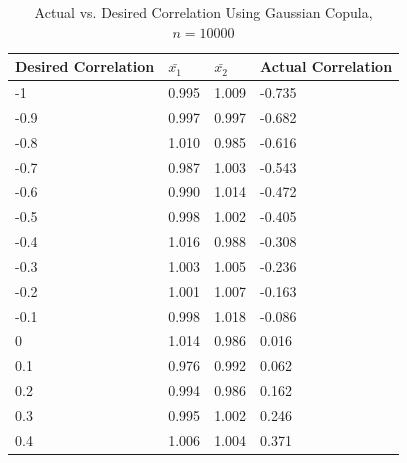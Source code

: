 \begin{table}
\label{tab:experimental_correlation}
\centering
\caption{Actual vs. Desired Correlation Using Gaussian Copula, $n=10000$}
\begin{tabular}{l|l|l|l}
\hline \hline
\textbf{Desired Correlation} & $\bar{x_1}$ & $\bar{x_2}$ & \textbf{Actual Correlation}  \\ 
\hline
-1                  & 0.995                           & 1.009                           & -0.735              \\
-0.9                & 0.997                           & 0.997                           & -0.682              \\
-0.8                & 1.010                            & 0.985                           & -0.616              \\
-0.7                & 0.987                           & 1.003                           & -0.543              \\
-0.6                & 0.990                            & 1.014                           & -0.472              \\
-0.5                & 0.998                           & 1.002                           & -0.405              \\
-0.4                & 1.016                           & 0.988                           & -0.308              \\
-0.3                & 1.003                           & 1.005                           & -0.236              \\
-0.2                & 1.001                           & 1.007                           & -0.163              \\
-0.1                & 0.998                           & 1.018                           & -0.086              \\
0                   & 1.014                           & 0.986                           & 0.016               \\
0.1                 & 0.976                           & 0.992                           & 0.062               \\
0.2                 & 0.994                           & 0.986                           & 0.162               \\
0.3                 & 0.995                           & 1.002                           & 0.246               \\
0.4                 & 1.006                           & 1.004                           & 0.371               \\

\end{tabular}
\end{table}
